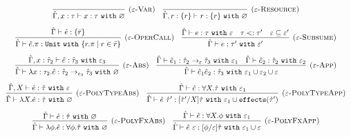 \documentclass{llncs}
\newcommand{\keywadj}[1]{\mathtt{#1}}
\newcommand{\keyw}[1]{\keywadj{#1}~}
\newcommand{\kw}[1]{\keyw{ #1 }}
\newcommand{\kwa}[1]{\keywadj{ #1 }}
\newcommand{\fx}[1]{ \kwa{effects}(#1) }
\begin{document}
\[
\begin{array}{c}

\infer[\textsc{($\varepsilon$-Var)}]
	{ \hat \Gamma, x:\tau \vdash x: \tau~\kw{with} \varnothing }
	{}
~~~
\infer[\textsc{($\varepsilon$-Resource)}]
 	{ \hat \Gamma, r: \{ r \} \vdash r : \{ r \}~\kw{with} \varnothing }
 	{}\\[2ex]
 	


\infer[\textsc{($\varepsilon$-OperCall)}]
	{ \hat \Gamma \vdash \hat e.\pi: \kw{Unit} \kw{with} \{ r.\pi \mid r \in \bar r \} }
	{ \hat \Gamma \vdash \hat e: \{ \bar r \}}
	~~~

\infer[\textsc{($\varepsilon$-Subsume)}]
	{\hat \Gamma \vdash e: \tau' ~\kw{with} \varepsilon'}
	{\hat \Gamma \vdash e: \tau ~\kw{with} \varepsilon & \tau <: \tau' & \varepsilon \subseteq \varepsilon'}\\[2ex]

	\infer[\textsc{($\varepsilon$-Abs)}]
	{ \hat \Gamma \vdash \lambda x:\tau_2 . \hat e : \hat \tau_2 \rightarrow_{\varepsilon_3} \hat \tau_3~\kw{with} \varnothing }
	{ \hat \Gamma, x: \hat \tau_2 \vdash \hat e: \hat \tau_3~\kw{with} \varepsilon_3 }
	~~~
\infer[\textsc{($\varepsilon$-App)}]
	{ \hat \Gamma \vdash \hat e_1 \hat e_2 : \hat \tau_3~\kw{with} \varepsilon_1 \cup \varepsilon_2 \cup \varepsilon  }
	{ \hat \Gamma \vdash \hat e_1: \hat \tau_2 \rightarrow_{\varepsilon} \hat \tau_3~\kw{with} \varepsilon_1 & \hat \Gamma \vdash \hat e_2: \hat \tau_2~\kw{with} \varepsilon_2 } \\[2ex]

\infer[\textsc{($\varepsilon$-PolyTypeAbs)}]
	{ \hat \Gamma \vdash \lambda X. \hat e : \hat \tau ~\kw{with} \varnothing }
	{ \hat \Gamma, X \vdash \hat e: \hat \tau ~\kw{with} \varepsilon }

~~~

\infer[\textsc{($\varepsilon$-PolyTypeApp)}]
	{ \hat \Gamma \vdash \hat e~\hat \tau' : [\hat \tau'/X]\hat \tau~\kw{with} \varepsilon_1 \cup \fx{\hat \tau'} }
	{ \hat \Gamma \vdash \hat e : \forall X.\hat \tau~\kw{with} \varepsilon_1 } \\[2ex]

\infer[\textsc{($\varepsilon$-PolyFxAbs)}]
	{ \hat \Gamma \vdash \lambda \phi. \hat e : \forall \phi. \hat \tau~\kw{with} \varnothing }
	{ \hat \Gamma \vdash \hat e : \hat \tau ~\kw{with} \varnothing }

~~~

\infer[\textsc{($\varepsilon$-PolyFxApp)}]
	{ \hat \Gamma \vdash \hat e~\varepsilon : [\phi/\varepsilon]\hat \tau~\kw{with} \varepsilon_1 \cup \varepsilon }
	{ \hat \Gamma \vdash \hat e: \forall X.\phi~\kw{with} \varepsilon_1 } \\[2ex]


\end{array}\]
\end{document}
